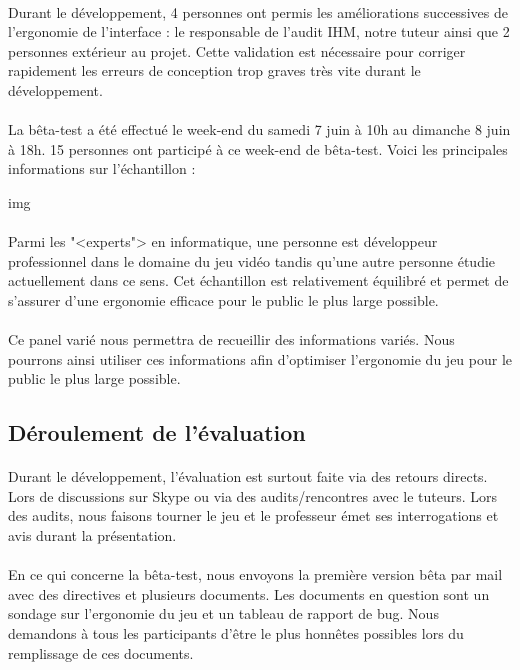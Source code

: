 \documentclass[11pt]{article} %
\begin{document}
\paragraph{}
Durant le développement, 4 personnes ont permis les améliorations successives de l'ergonomie de l'interface : le responsable de l'audit IHM, notre tuteur ainsi que 2 personnes extérieur au projet. Cette validation est nécessaire pour corriger rapidement les erreurs de conception trop graves très vite durant le développement.
\paragraph{}
La bêta-test a été effectué le week-end du samedi 7 juin à 10h au dimanche 8 juin à 18h. 15 personnes ont participé à ce week-end de bêta-test. Voici les principales informations sur l'échantillon :

img

\paragraph{}
Parmi les "<experts"> en informatique, une personne est développeur professionnel dans le domaine du jeu vidéo tandis qu'une autre personne étudie actuellement dans ce sens. Cet échantillon est relativement équilibré et permet de s'assurer d'une ergonomie efficace pour le public le plus large possible.

\paragraph{}
Ce panel varié nous permettra de recueillir des informations variés. Nous pourrons ainsi utiliser ces informations afin d'optimiser l'ergonomie du jeu pour le public le plus large possible.

\subsection{Déroulement de l'évaluation}
\paragraph{}
Durant le développement, l’évaluation est surtout faite via des retours directs. Lors de discussions sur Skype ou via des audits/rencontres avec le tuteurs. Lors des audits, nous faisons tourner le jeu et le professeur émet ses interrogations et avis durant la présentation. 
\paragraph{}
En ce qui concerne la bêta-test, nous envoyons la première version bêta par mail avec des directives et plusieurs documents. Les documents en question sont un sondage sur l'ergonomie du jeu et un tableau de rapport de bug. Nous demandons à tous les participants d'être le plus honnêtes possibles lors du remplissage de ces documents.
\end{document}
